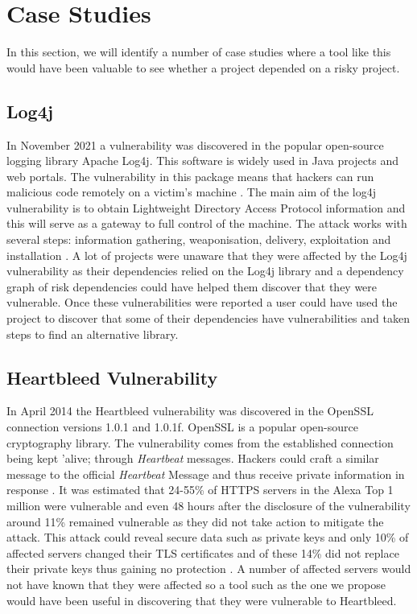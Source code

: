 \documentclass[conference]{IEEEtran}
\begin{document}
\section{Case Studies}
In this section, we will identify a number of case studies where a tool like this would have been valuable to see whether a project depended on a risky project. 

\subsection{Log4j}
In November 2021 a vulnerability was discovered in the popular open-source logging library Apache Log4j. This software is widely used in Java projects and web portals. The vulnerability in this package means that hackers can run malicious code remotely on a victim's machine \cite{h_gupta_identification_2022}. The main aim of the log4j vulnerability is to obtain Lightweight Directory Access Protocol information and this will serve as a gateway to full control of the machine. The attack works with several steps: information gathering, weaponisation, delivery, exploitation and installation \cite{f_maulana_unmasking_2023}. A lot of projects were unaware that they were affected by the Log4j vulnerability as their dependencies relied on the Log4j library and a dependency graph of risk dependencies could have helped them discover that they were vulnerable. Once these vulnerabilities were reported a user could have used the project to discover that some of their dependencies have vulnerabilities and taken steps to find an alternative library. 

\subsection{Heartbleed Vulnerability}
In April 2014 the Heartbleed vulnerability was discovered in the OpenSSL connection versions 1.0.1 and 1.0.1f. OpenSSL is a popular open-source cryptography library. The vulnerability comes from the established connection being kept 'alive; through \textit{Heartbeat} messages. Hackers could craft a similar message to the official \textit{Heartbeat} Message and thus receive private information in response \cite{s_kyatam_heartbleed_2017}. It was estimated that 24-55\% of HTTPS servers in the Alexa Top 1 million were vulnerable and even 48 hours after the disclosure of the vulnerability around 11\% remained vulnerable as they did not take action to mitigate the attack. This attack could reveal secure data such as private keys and only 10\% of affected servers changed their TLS certificates and of these 14\% did not replace their private keys thus gaining no protection \cite{durumeric_matter_2014}. A number of affected servers would not have known that they were affected so a tool such as the one we propose would have been useful in discovering that they were vulnerable to Heartbleed. 
\end{document}
